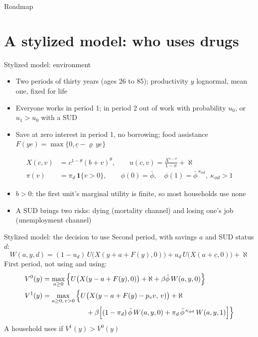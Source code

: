 \documentclass[aspectratio=169,11pt]{beamer}
\begin{document}
\begin{frame}{Roadmap}
\tableofcontents
\end{frame}

\section{A stylized model: who uses drugs}

\begin{frame}{Stylized model: environment}
\begin{itemize}\setlength\itemsep{0.3em}
\item Two periods of thirty years (ages 26 to 85); productivity $y$ lognormal, mean one, fixed for life
\item Everyone works in period 1; in period 2 out of work with probability $u_0$, or $u_1>u_0$ with a SUD
\item Save at zero interest in period 1, no borrowing; food assistance $F(ye)=\max\{0,\underline c-\varrho\,ye\}$
\end{itemize}
\begin{align*}
X(c,v)&=c^{1-\theta}(b+v)^{\theta}, \qquad u(c,v)=\frac{X^{1-\sigma}}{1-\sigma}+\aleph\\
\pi(v)&=\pi_d\,\mathbf{1}\{v>0\}, \qquad \phi(0)=\bar\phi,\quad \phi(1)=\bar\phi^{\,\kappa_{\phi d}},\ \kappa_{\phi d}>1
\end{align*}
\begin{itemize}
\item $b>0$: the first unit's marginal utility is finite, so most households use none
\item A SUD brings two risks: \alert{dying} (mortality channel) and \alert{losing one's job} (unemployment channel)
\end{itemize}
\end{frame}

\begin{frame}{Stylized model: the decision to use}
Second period, with savings $a$ and SUD status $d$:
\[
W(a,y,d)=(1-u_d)\,U\big(X(y+a+F(y),0)\big)+u_d\,U\big(X(a+\underline c,0)\big)+\aleph
\]
First period, not using and using:
\begin{align*}
V^0(y)&=\max_{a\ge0}\Big\{U\big(X(y-a+F(y),0)\big)+\aleph+\beta\bar\phi\,W(a,y,0)\Big\}\\
V^1(y)&=\max_{a\ge0,\,v>0}\Big\{U\big(X(y-a+F(y)-p_v v,\,v)\big)+\aleph\\
&\hspace{2.2cm}+\beta\Big[(1-\pi_d)\,\bar\phi\,W(a,y,0)+\pi_d\,\bar\phi^{\,\kappa_{\phi d}}\,W(a,y,1)\Big]\Big\}
\end{align*}
A household uses if $V^1(y)>V^0(y)$
\end{frame}
\end{document}
